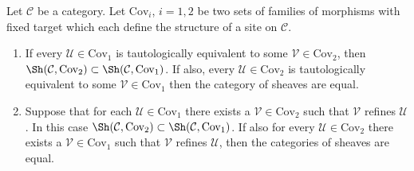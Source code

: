 \begin{lemma}
\label{lemma-refine-same-topology}
Let $\mathcal{C}$ be a category. Let $\text{Cov}_i$, $i = 1, 2$
be two sets of families of morphisms with fixed target which
each define the structure of a site on $\mathcal{C}$.
\begin{enumerate}
\item If every $\mathcal{U} \in \text{Cov}_1$ is tautologically
equivalent to some $\mathcal{V} \in \text{Cov}_2$, then
$\Sh(\mathcal{C}, \text{Cov}_2) \subset
\Sh(\mathcal{C}, \text{Cov}_1)$.
If also, every $\mathcal{U} \in \text{Cov}_2$ is tautologically
equivalent to some $\mathcal{V} \in \text{Cov}_1$ then
the category of sheaves are equal.
\item Suppose
that for each $\mathcal{U} \in \text{Cov}_1$ there exists a
$\mathcal{V} \in \text{Cov}_2$ such that $\mathcal{V}$ refines
$\mathcal{U}$. In this case
$\Sh(\mathcal{C}, \text{Cov}_2) \subset
\Sh(\mathcal{C}, \text{Cov}_1)$.
If also for every $\mathcal{U} \in \text{Cov}_2$
there exists a $\mathcal{V} \in \text{Cov}_1$ such that $\mathcal{V}$
refines $\mathcal{U}$, then the categories of sheaves
are equal.
\end{enumerate}
\end{lemma}

